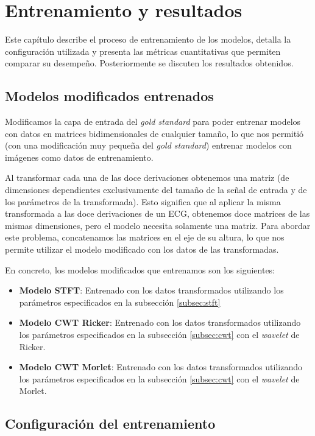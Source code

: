 \chapter{Entrenamiento y resultados}
\label{cap:train}
\begin{resumen}
	Este capítulo describe el proceso de entrenamiento de los modelos, detalla la configuración utilizada y presenta las métricas cuantitativas que permiten comparar su desempeño. Posteriormente se discuten los resultados obtenidos.
\end{resumen}

\section{Modelos modificados entrenados}
Modificamos la capa de entrada del \emph{gold standard} para poder entrenar modelos con datos en matrices bidimensionales de cualquier tamaño, lo que nos permitió (con una modificación muy pequeña del \emph{gold standard}) entrenar modelos con imágenes como datos de entrenamiento.

Al transformar cada una de las doce derivaciones obtenemos una matriz (de dimensiones dependientes exclusivamente del tamaño de la señal de entrada y de los parámetros de la transformada). Esto significa que al aplicar la misma transformada a las doce derivaciones de un ECG, obtenemos doce matrices de las mismas dimensiones, pero el modelo necesita solamente una matriz. Para abordar este problema, concatenamos las matrices en el eje de su altura, lo que nos permite utilizar el modelo modificado con los datos de las transformadas.

En concreto, los modelos modificados que entrenamos son los siguientes:
\begin{itemize}
	\item \textbf{Modelo STFT}: Entrenado con los datos transformados utilizando los parámetros especificados en la subsección \ref{subsec:stft}
	\item \textbf{Modelo CWT Ricker}: Entrenado con los datos transformados utilizando los parámetros especificados en la subsección \ref{subsec:cwt} con el \emph{wavelet} de Ricker.
	\item \textbf{Modelo CWT Morlet}: Entrenado con los datos transformados utilizando los parámetros especificados en la subsección \ref{subsec:cwt} con el \emph{wavelet} de Morlet.
\end{itemize}

\section{Configuración del entrenamiento}
